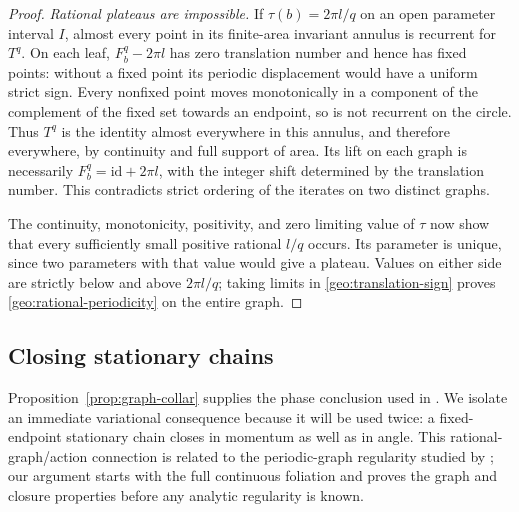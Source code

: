 \begin{proof}
\emph{Rational plateaus are impossible.}
If $\tau(b)=2\pi l/q$ on an open parameter interval $I$, almost every
point in its finite-area invariant annulus is recurrent for $T^q$.
On each leaf, $F_b^q-2\pi l$ has zero translation number and hence has
fixed points: without a fixed point its periodic displacement would
have a uniform strict sign.  Every nonfixed point moves monotonically
in a component of the complement of the fixed set towards an endpoint,
so is not recurrent on the circle.  Thus $T^q$ is the identity almost
everywhere in this annulus, and therefore everywhere, by continuity and
full support of area.  Its lift on each graph is necessarily
$F_b^q=\mathrm{id}+2\pi l$, with the integer shift determined by the
translation number.  This contradicts strict ordering of the iterates
on two distinct graphs.

The continuity, monotonicity, positivity, and zero limiting value of
$\tau$ now show that every sufficiently small positive rational
$l/q$ occurs.  Its parameter is unique, since two parameters with that
value would give a plateau.  Values on either side are strictly below
and above $2\pi l/q$; taking limits in
\eqref{geo:translation-sign} proves
\eqref{geo:rational-periodicity} on the entire graph.
\end{proof}

\subsection{Closing stationary chains}

Proposition~\ref{prop:graph-collar} supplies the phase conclusion used in
\cite[Lemma~2.2]{NB}.  We isolate an immediate variational consequence
because it will be used twice: a fixed-endpoint stationary chain closes
in momentum as well as in angle. This rational-graph/action connection is
related to the periodic-graph regularity studied by
\citet[Appendix, Proposition~A.1]{FierobeSorrentino2026}; our argument
starts with the full continuous foliation and proves the graph and closure
properties before any analytic regularity is known.


